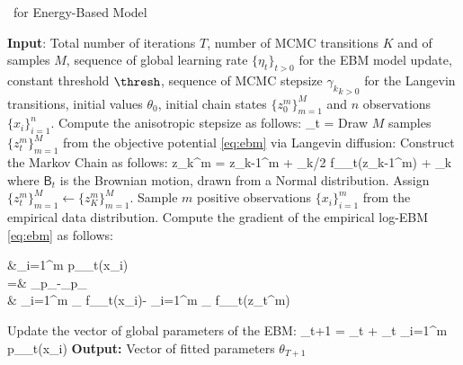 \documentclass[10pt,twocolumn,letterpaper]{article}
\begin{document}
\begin{algorithm}[H]
\caption{\algo\ for Energy-Based Model} \label{alg:anila}
\begin{algorithmic}[1]
\STATE \textbf{Input}: Total number of iterations $T$, number of MCMC transitions $K$ and of samples $M$, sequence of global learning rate $\{\eta_t\}_{t >0}$ for the EBM model update, constant threshold $\thresh$,  sequence of MCMC stepsize ${\gamma_k}_{k >0}$ for the Langevin transitions, initial values $\theta_0$, initial chain states $\{ z_{0}^m \}_{m=1}^M$ and $n$ observations $\{ x_{i} \}_{i=1}^n$.
\STATE Compute the anisotropic stepsize as follows: \label{line:step}
\beq\label{eq:step}
\stepsize_t = 
\eeq
\STATE Draw $M$ samples $\{ z_{t}^m \}_{m=1}^M$ from the objective potential \eqref{eq:ebm} via Langevin diffusion:\label{line:langevin}
\STATE Construct the Markov Chain as follows:
\beq\label{eq:anila}
z_{k}^{m} = z_{k-1}^m + \stepsize_k/2  \nabla f_{\theta_t}(z_{k-1}^m) +  _k
\eeq
where $\mathsf{B}_t$ is the Brownian motion, drawn from a Normal distribution.
\ENDFOR
\STATE Assign $\{ z_{t}^m \}_{m=1}^M \leftarrow \{ z_{K}^m \}_{m=1}^M$.
\STATE Sample $m$ positive observations $\{ x_{i} \}_{i=1}^m$ from the empirical data distribution.
\STATE Compute the gradient of the empirical log-EBM \eqref{eq:ebm} as follows:
\beq\notag
\begin{split}
&\nabla \sum_{i=1}^m \log p_{\theta_t}(x_i) \\
 =& _{p_{}}-_{p_{\theta}}\\
 \approx &  \sum_{i=1}^{m} \nabla_{\theta} f_{\theta_t}\left(x_{i}\right)- \sum_{i=1}^{m} \nabla_{\theta} f_{\theta_t}\left(z_t^m\right)
\end{split}
\eeq
\STATE Update the vector of global parameters of the EBM:\label{line:gradient}
\beq\notag
\theta_{t+1} = \theta_{t} + \eta_t \nabla \sum_{i=1}^m \log p_{\theta_t}(x_i)
\eeq
\ENDFOR
\STATE \textbf{Output:} Vector of fitted parameters $\theta_{T+1}$
\end{algorithmic}
\end{algorithm}
\end{document}
